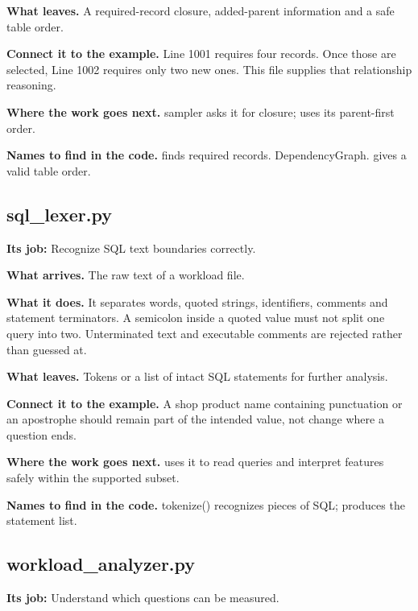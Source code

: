 \textbf{What leaves.} A required-record closure, added-parent information and a safe table order.

\textbf{Connect it to the example.} Line 1001 requires four records. Once those are selected, Line 1002 requires only two new ones. This file supplies that relationship reasoning.

\textbf{Where the work goes next.} sampler asks it for closure;  uses its parent-first order.

\textbf{Names to find in the code.}  finds required records. DependencyGraph. gives a valid table order.


\subsection{sql\_lexer.py}

\textbf{Its job:} Recognize SQL text boundaries correctly.

\textbf{What arrives.} The raw text of a workload file.

\textbf{What it does.} It separates words, quoted strings, identifiers, comments and statement terminators. A semicolon inside a quoted value must not split one query into two. Unterminated text and executable comments are rejected rather than guessed at.

\textbf{What leaves.} Tokens or a list of intact SQL statements for further analysis.

\textbf{Connect it to the example.} A shop product name containing punctuation or an apostrophe should remain part of the intended value, not change where a question ends.

\textbf{Where the work goes next.}  uses it to read queries and interpret features safely within the supported subset.

\textbf{Names to find in the code.} tokenize() recognizes pieces of SQL;  produces the statement list.


\subsection{workload\_analyzer.py}

\textbf{Its job:} Understand which questions can be measured.

